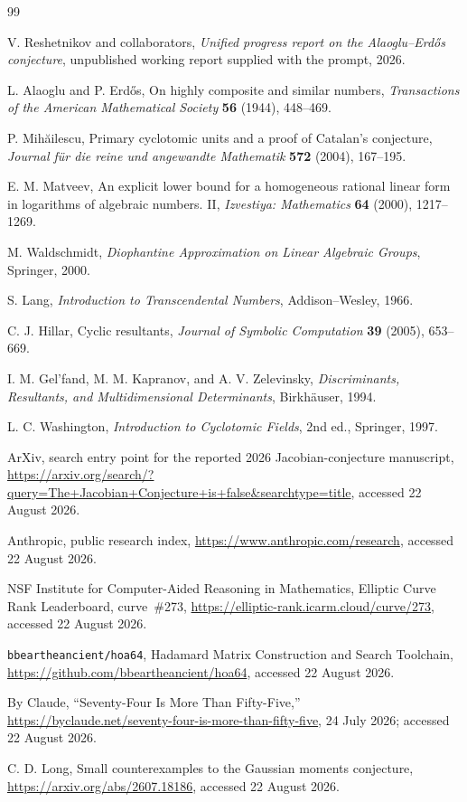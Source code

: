 \documentclass[11pt]{article}
\theoremstyle{definition}
\theoremstyle{remark}
\begin{document}
\begin{thebibliography}{99}

V. Reshetnikov and collaborators,
\emph{Unified progress report on the Alaoglu--Erd\H{o}s conjecture},
unpublished working report supplied with the prompt, 2026.

L. Alaoglu and P. Erd\H{o}s,
On highly composite and similar numbers,
\emph{Transactions of the American Mathematical Society} \textbf{56} (1944), 448--469.

P. Mih\u{a}ilescu,
Primary cyclotomic units and a proof of Catalan's conjecture,
\emph{Journal f\"ur die reine und angewandte Mathematik} \textbf{572} (2004), 167--195.

E. M. Matveev,
An explicit lower bound for a homogeneous rational linear form in logarithms of algebraic numbers. II,
\emph{Izvestiya: Mathematics} \textbf{64} (2000), 1217--1269.

M. Waldschmidt,
\emph{Diophantine Approximation on Linear Algebraic Groups},
Springer, 2000.

S. Lang,
\emph{Introduction to Transcendental Numbers},
Addison--Wesley, 1966.

C. J. Hillar,
Cyclic resultants,
\emph{Journal of Symbolic Computation} \textbf{39} (2005), 653--669.

I. M. Gel'fand, M. M. Kapranov, and A. V. Zelevinsky,
\emph{Discriminants, Resultants, and Multidimensional Determinants},
Birkh\"auser, 1994.

L. C. Washington,
\emph{Introduction to Cyclotomic Fields}, 2nd ed.,
Springer, 1997.

ArXiv,
search entry point for the reported 2026 Jacobian-conjecture manuscript,
\url{https://arxiv.org/search/?query=The+Jacobian+Conjecture+is+false&searchtype=title},
accessed 22 August 2026.

Anthropic,
public research index,
\url{https://www.anthropic.com/research},
accessed 22 August 2026.

NSF Institute for Computer-Aided Reasoning in Mathematics,
Elliptic Curve Rank Leaderboard, curve~\#273,
\url{https://elliptic-rank.icarm.cloud/curve/273},
accessed 22 August 2026.

\texttt{bbeartheancient/hoa64},
Hadamard Matrix Construction and Search Toolchain,
\url{https://github.com/bbeartheancient/hoa64},
accessed 22 August 2026.

By Claude,
``Seventy-Four Is More Than Fifty-Five,''
\url{https://byclaude.net/seventy-four-is-more-than-fifty-five},
24 July 2026; accessed 22 August 2026.

C. D. Long,
Small counterexamples to the Gaussian moments conjecture,
\url{https://arxiv.org/abs/2607.18186},
accessed 22 August 2026.

\end{thebibliography}
\end{document}

